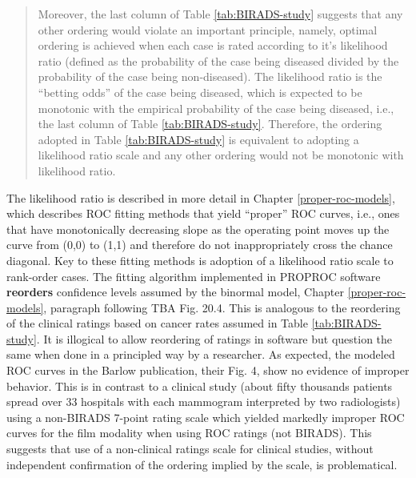 \documentclass[
]{book}
\begin{document}
\begin{quote}
Moreover, the last column of Table \ref{tab:BIRADS-study} suggests that any other ordering would violate an important principle, namely, optimal ordering is achieved when each case is rated according to it's likelihood ratio (defined as the probability of the case being diseased divided by the probability of the case being non-diseased). The likelihood ratio is the ``betting odds'' of the case being diseased, which is expected to be monotonic with the empirical probability of the case being diseased, i.e., the last column of Table \ref{tab:BIRADS-study}. Therefore, the ordering adopted in Table \ref{tab:BIRADS-study} is equivalent to adopting a likelihood ratio scale and any other ordering would not be monotonic with likelihood ratio.
\end{quote}

The likelihood ratio is described in more detail in Chapter \ref{proper-roc-models}, which describes ROC fitting methods that yield ``proper'' ROC curves, i.e., ones that have monotonically decreasing slope as the operating point moves up the curve from (0,0) to (1,1) and therefore do not inappropriately cross the chance diagonal. Key to these fitting methods is adoption of a likelihood ratio scale to rank-order cases. The fitting algorithm implemented in PROPROC software \textbf{reorders} confidence levels assumed by the binormal model, Chapter \ref{proper-roc-models}, paragraph following TBA Fig. 20.4. This is analogous to the reordering of the clinical ratings based on cancer rates assumed in Table \ref{tab:BIRADS-study}. It is illogical to allow reordering of ratings in software but question the same when done in a principled way by a researcher. As expected, the modeled ROC curves in the Barlow publication, their Fig. 4, show no evidence of improper behavior. This is in contrast to a clinical study (about fifty thousands patients spread over 33 hospitals with each mammogram interpreted by two radiologists) using a non-BIRADS 7-point rating scale which yielded markedly improper ROC curves \citep{pisano2005diagnostic} for the film modality when using ROC ratings (not BIRADS). This suggests that use of a non-clinical ratings scale for clinical studies, without independent confirmation of the ordering implied by the scale, is problematical.
\end{document}
